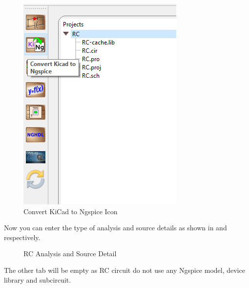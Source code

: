 \begin{itemize}
\begin{figure}[!htp]
\centering
\includegraphics[width=\tnfig]{figures/rc_ki2ng.png}
\caption{Convert KiCad to Ngspice Icon}
\label{rcki2ng}
\end{figure}

Now you can enter the type of analysis and source details as shown in  and  respectively.

\begin{figure}[!htp]
    \centering
     \hfill
    \caption{RC Analysis and Source Detail}
\end{figure}
The other tab will be empty as RC circuit do not use any Ngspice model, device library and subcircuit.


\end{itemize}

